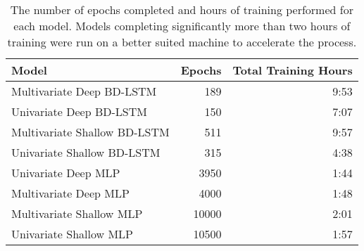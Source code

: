 \begin{table}[H]
\centering
\begin{tabular}{lrr}
\toprule
Model & Epochs & Total Training Hours \\
\midrule
Multivariate Deep BD-LSTM & 189 & 9:53 \\
Univariate Deep BD-LSTM & 150 & 7:07 \\
Multivariate Shallow BD-LSTM & 511 & 9:57 \\
Univariate Shallow BD-LSTM & 315 & 4:38 \\
Univariate Deep MLP & 3950 & 1:44 \\
Multivariate Deep MLP & 4000 & 1:48 \\
Multivariate Shallow MLP & 10000 & 2:01 \\
Univariate Shallow MLP & 10500 & 1:57 \\
\bottomrule
\end{tabular}
\caption{The number of epochs completed and hours of training performed for each model. Models completing significantly more than two hours of training were run on a better suited machine to accelerate the process.}
\label{tsummary}
\end{table}
